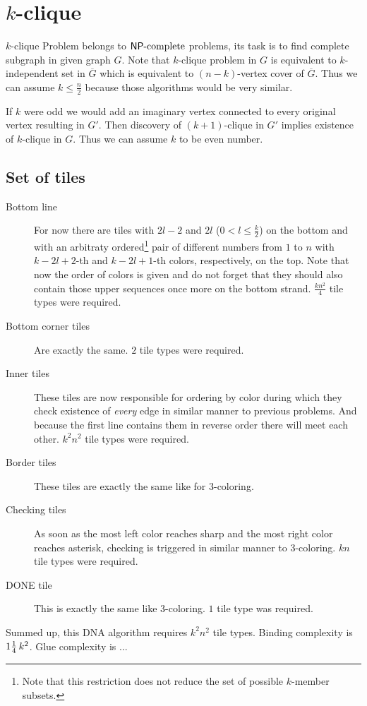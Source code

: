 \section{$k$-clique}


$k$-clique Problem belongs to $\mathsf{NP}\textnormal{-complete}$ problems, its task is to find complete subgraph in given graph $G$. Note that $k$-clique problem in $G$ is equivalent to $k$-independent set in $\overline{G}$ which is equivalent to $(n-k)$-vertex cover of $\overline{G}$. Thus we can assume $k \leq \frac{n}{2}$ because those algorithms would be very similar.

If $k$ were odd we would add an imaginary vertex connected to every original vertex resulting in $G'$. Then discovery of $(k+1)$-clique in $G'$ implies existence of $k$-clique in $G$. Thus we can assume $k$ to be even number.



\subsection*{Set of tiles}

\begin{description}
	\item[Bottom line] For now there are tiles with $2l-2$ and $2l$ ($0 < l \leq \frac{k}{2}$) on the bottom and with an arbitraty ordered\footnote{Note that this restriction does not reduce the set of possible $k$-member subsets.} pair of different numbers from $1$ to $n$ with $k-2l+2$-th and $k-2l+1$-th colors, respectively, on the top. Note that now the order of colors is given and do not forget that they should also contain those upper sequences once more on the bottom strand. $\frac{kn^2}{4}$ tile types were required. %
	\item[Bottom corner tiles] Are exactly the same. $2$ tile types were required.
	\item[Inner tiles] These tiles are now responsible for ordering by color during which they check existence of {\em every} edge in similar manner to previous problems. And because the first line contains them in reverse order there will meet each other. $k^2 n^2$ tile types were required. %
	\item[Border tiles] These tiles are exactly the same like for 3-coloring.
	\item[Checking tiles] As soon as the most left color reaches sharp and the most right color reaches asterisk, checking is triggered in similar manner to 3-coloring. $kn$ tile types were required.
	\item[DONE tile] This is exactly the same like 3-coloring. $1$ tile type was required.
\end{description}
Summed up, this DNA algorithm requires $k^2 n^2$ tile types. Binding complexity is $1\nicefrac{1}{4}\,k^2$. Glue complexity is ... %

